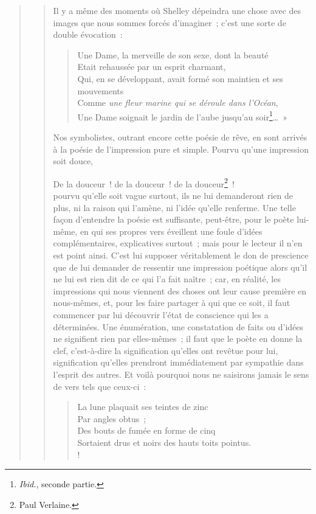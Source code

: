 \documentclass[french,twoside]{book} %
\begin{document}
\begin{verse}
\begin{verse}
\noindent Il y a même des moments où Shelley dépeindra une chose avec des images que nous sommes forcés d’imaginer ; c’est une sorte de double évocation :\par


\begin{verse}
Une Dame, la merveille de son sexe, dont la beauté\\
Etait rehaussée par un esprit charmant,\\
Qui, en se développant, avait formé son maintien et ses mouvements\\
Comme \emph{une fleur marine qui se déroule dans l’Océan},\\
Une Dame soignait le jardin de l’aube jusqu’au soir\footnote{\emph{Ibid.}, seconde partie.}… »\\
\end{verse}

\noindent Nos symbolistes, outrant encore cette poésie de rêve, en sont arrivés à la poésie de l’impression pure et simple. Pourvu qu’une impression soit douce,\par

De la douceur ! de la douceur ! de la douceur\footnote{Paul Verlaine.} !\\

\noindent pourvu qu’elle soit vague surtout, ils ne lui demanderont rien de plus, ni la raison qui l’amène, ni l’idée qu’elle renferme. Une telle façon d’entendre la poésie est suffisante, peut-être, pour le poète lui-même, en qui ses propres vers éveillent une foule d’idées complémentaires, explicatives surtout ; mais pour le lecteur il n’en est point ainsi. C’est lui supposer véritablement le don de prescience que de lui demander de ressentir une impression poétique alors qu’il ne lui est rien dit de ce qui l’a fait naître ; car, en réalité, les impressions qui nous viennent des choses ont leur cause première en nous-mêmes, et, pour les faire partager à qui que ce soit, il faut commencer par lui découvrir l’état de conscience qui les a déterminées. Une énumération, une constatation de faits ou d’idées ne signifient rien par elles-mêmes ; il faut que le poète en donne la clef, c’est-à-dire la signification qu’elles ont revêtue pour lui, signification qu’elles prendront immédiatement par sympathie dans l’esprit des autres. Et voilà pourquoi nous ne saisirons jamais le sens de vers tels que ceux-ci :\par


\begin{verse}
La lune plaquait ses teintes de zinc\\
Par angles obtus ;\\
Des bouts de fumée en forme de cinq\\
Sortaient drus et noirs des hauts toits pointus.\\!


\end{verse}
\end{verse}
\end{verse}
\end{document}
